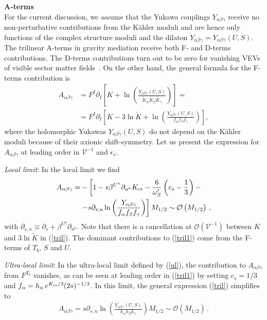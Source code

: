 \documentclass[12pt,a4paper]{book}
\def\nn{\nonumber}
\def\nn{\nonumber}
\newcommand{\mc}{\mathcal}
\begin{document}
\item \textbf{A-terms}\\
For the current discussion, we assume that the Yukawa couplings $Y_{\alpha \beta \gamma}$ receive no non-perturbative contributions from the K\"ahler moduli and are hence only functions of the complex structure moduli and the dilaton $Y_{\alpha \beta \gamma}=Y_{\alpha \beta \gamma}(U,S)$. The trilinear A-terms in gravity mediation receive both F- and D-terms contributions. The D-terms contributions turn out to be zero for vanishing VEVs of visible sector matter fields~\cite{Dudas:2005vv}. On the other hand, the general formula for the F-terms contribution is~\cite{Brignole:1993dj}
\begin{align}
\label{tril}
A_{\alpha\beta\gamma} &= F^I \partial_I \left[K + \ln \left(\frac{Y_{\alpha \beta \gamma}(U,S)}{\tilde{K}_\alpha \tilde{K}_\beta \tilde{K}_\gamma}\right)\right] = \nn \\
&= F^I \partial_I \left[K -3\ln\tilde{K}+ \ln \left(\frac{Y_{\alpha \beta \gamma}(U,S)}{f_\alpha f_\beta f_\gamma}\right)\right],
\end{align}
where the holomorphic Yukawas $Y_{\alpha \beta \gamma}(U,S)$ do not depend on the K\"ahler moduli because of their axionic shift-symmetry. Let us present the expression for $A_{\alpha\beta\gamma}$ at leading order in $\mathcal{V}^{-1}$ and $\epsilon_s$.

\medskip
\emph{Local limit}: In the local limit we find
\begin{align}
\label{tril1}
A_{\alpha\beta\gamma}= &- \left[1 -s\beta^{U^a}\partial_{u^a} K_{\rm cs} - \frac{6}{\omega'_S}\left(c_s-\frac 13\right) - \right. \nn \\
&\left.- s \partial_{s,u} \ln \left(\frac{Y_{\alpha \beta \gamma}}{f_\alpha f_\beta f_\gamma} \right) \right] M_{1/2}\sim\mc{O}\left(M_{1/2}\right)\,,
\end{align}
with $\partial_{s,u}\equiv \partial_s+\beta^{U^a}\partial_{u^a}$.
Note that there is a cancellation at $\mc{O}(\mathcal{V}^{-1})$ between $K$ and $3\ln\tilde{K}$ in (\ref{tril}).
The dominant contributions to (\ref{tril1}) come from the F-terms of $T_b$, $S$ and $U$.

\medskip
\emph{Ultra-local limit}: In the ultra-local limit defined by (\ref{ul}), the contribution to $A_{\alpha\beta\gamma}$ from $F^{T_b}$ vanishes, as can be seen at leading order in (\ref{tril1}) by setting $c_s=1/3$ and $f_{\alpha} = h_\alpha\,e^{K_{\rm cs}/3}(2s)^{-1/3}$. In this limit, the general expression (\ref{tril}) simplifies to
\begin{align}
\label{trilul}
A_{\alpha\beta\gamma} = s \partial_{s,u}
\ln \left(\frac{Y_{\alpha \beta \gamma}(U,S)}{h_\alpha h_\beta h_\gamma}\right) M_{1/2}\sim\mc{O}\left(M_{1/2}\right)\,.
\end{align}
\end{document}

